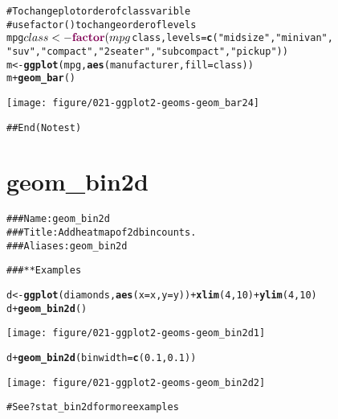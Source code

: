 \documentclass[a4paper,titlepage]{tufte-handout}\usepackage{graphicx, color}
\makeatletter
\def\maxwidth{ %
  \ifdim\Gin@nat@width>\linewidth
    \linewidth
  \else
    \Gin@nat@width
  \fi
}
\newcommand{\hlfunctioncall}[1]{\textcolor[rgb]{0.501960784313725,0,0.329411764705882}{\textbf{#1}}}%
\newcommand{\hlstring}[1]{\textcolor[rgb]{0.6,0.6,1}{#1}}%
\newcommand{\hlcomment}[1]{\textcolor[rgb]{0.180392156862745,0.6,0.341176470588235}{#1}}%
\newenvironment{kframe}{%
 \def\at@end@of@kframe{}%
 \ifinner\ifhmode%
  \def\at@end@of@kframe{\end{minipage}}%
  \begin{minipage}{\columnwidth}%
 \fi\fi%
 \def\FrameCommand##1{\hskip\@totalleftmargin \hskip-\fboxsep
 \colorbox{shadecolor}{##1}\hskip-\fboxsep
     \hskip-\linewidth \hskip-\@totalleftmargin \hskip\columnwidth}%
 \MakeFramed {\advance\hsize-\width
   \@totalleftmargin\z@ \linewidth\hsize
   \@setminipage}}%
 {\par\unskip\endMakeFramed%
 \at@end@of@kframe}
\newenvironment{knitrout}{}{} %
\makeatother
\begin{document}
\begin{knitrout}
\begin{kframe}
\begin{alltt}
\hlcomment{# To change plot order of class varible}
\hlcomment{# use factor() to change order of levels}
mpg$class <- \hlfunctioncall{factor}(mpg$class, levels = \hlfunctioncall{c}(\hlstring{"midsize"}, \hlstring{"minivan"},
\hlstring{"suv"}, \hlstring{"compact"}, \hlstring{"2seater"}, \hlstring{"subcompact"}, \hlstring{"pickup"}))
m <- \hlfunctioncall{ggplot}(mpg, \hlfunctioncall{aes}(manufacturer, fill=class))
m + \hlfunctioncall{geom_bar}()
\end{alltt}
\end{kframe}
\texttt{[image: figure/021-ggplot2-geoms-geom\_bar24]} 
\begin{kframe}\begin{alltt}
\hlcomment{## End(No test)}


\end{alltt}
\end{kframe}
\end{knitrout}



\section{geom\_bin2d}

\begin{knitrout}
\color{fgcolor}\begin{kframe}
\begin{alltt}
\hlcomment{### Name: geom_bin2d}
\hlcomment{### Title: Add heatmap of 2d bin counts.}
\hlcomment{### Aliases: geom_bin2d}

\hlcomment{### ** Examples}

d <- \hlfunctioncall{ggplot}(diamonds, \hlfunctioncall{aes}(x = x, y = y)) + \hlfunctioncall{xlim}(4,10) + \hlfunctioncall{ylim}(4,10)
d + \hlfunctioncall{geom_bin2d}()
\end{alltt}
\end{kframe}
\texttt{[image: figure/021-ggplot2-geoms-geom\_bin2d1]} 
\begin{kframe}\begin{alltt}
d + \hlfunctioncall{geom_bin2d}(binwidth = \hlfunctioncall{c}(0.1, 0.1))
\end{alltt}
\end{kframe}
\texttt{[image: figure/021-ggplot2-geoms-geom\_bin2d2]} 
\begin{kframe}\begin{alltt}

\hlcomment{# See ?stat_bin2d for more examples}


\end{alltt}
\end{kframe}
\end{knitrout}
\end{document}
